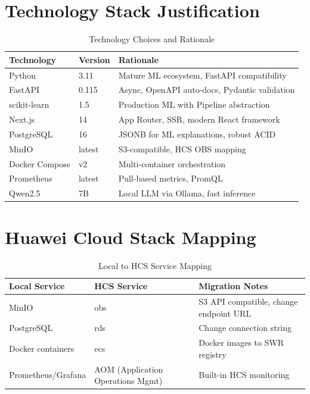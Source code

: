 \section{Technology Stack Justification}

\begin{table}[H]
\centering
\caption{Technology Choices and Rationale}
\label{tab:tech-stack}
\begin{tabular}{@{}lll@{}}
\toprule
\textbf{Technology} & \textbf{Version} & \textbf{Rationale} \\
\midrule
Python & 3.11 & Mature ML ecosystem, FastAPI compatibility \\
FastAPI & 0.115 & Async, OpenAPI auto-docs, Pydantic validation \\
scikit-learn & 1.5 & Production ML with Pipeline abstraction \\
Next.js & 14 & App Router, SSR, modern React framework \\
PostgreSQL & 16 & JSONB for ML explanations, robust ACID \\
MinIO & latest & S3-compatible, HCS OBS mapping \\
Docker Compose & v2 & Multi-container orchestration \\
Prometheus & latest & Pull-based metrics, PromQL \\
Qwen2.5 & 7B & Local LLM via Ollama, fast inference \\
\bottomrule
\end{tabular}
\end{table}

\section{Huawei Cloud Stack Mapping}

\begin{table}[H]
\centering
\caption{Local to HCS Service Mapping}
\label{tab:hcs-mapping}
\begin{tabular}{@{}lll@{}}
\toprule
\textbf{Local Service} & \textbf{HCS Service} & \textbf{Migration Notes} \\
\midrule
MinIO & \gls{obs} & S3 API compatible, change endpoint URL \\
PostgreSQL & \gls{rds} & Change connection string \\
Docker containers & \gls{ecs} & Docker images to SWR registry \\
Prometheus/Grafana & AOM (Application Operations Mgmt) & Built-in HCS monitoring \\
\bottomrule
\end{tabular}
\end{table}
